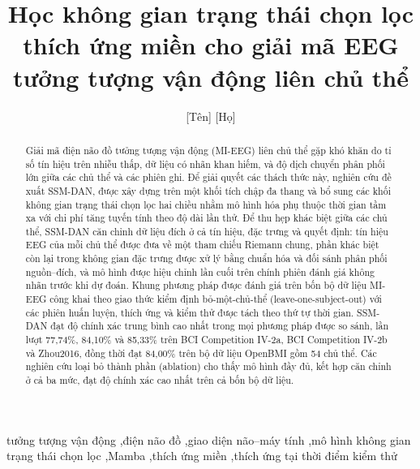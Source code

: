\documentclass[preprint,12pt]{elsarticle}
\begin{document}
\begin{frontmatter}

\title{Học không gian trạng thái chọn lọc thích ứng miền cho giải mã EEG tưởng tượng vận động liên chủ thể}

\author[aff1]{[Tên] [Họ]}


\begin{abstract}
Giải mã điện não đồ tưởng tượng vận động (MI-EEG) liên chủ thể gặp khó khăn do tỉ số tín hiệu trên nhiễu thấp, dữ liệu có nhãn khan hiếm, và độ dịch chuyển phân phối lớn giữa các chủ thể và các phiên ghi. Để giải quyết các thách thức này, nghiên cứu đề xuất SSM-DAN, được xây dựng trên một khối tích chập đa thang và bổ sung các khối không gian trạng thái chọn lọc hai chiều nhằm mô hình hóa phụ thuộc thời gian tầm xa với chi phí tăng tuyến tính theo độ dài lần thử. Để thu hẹp khác biệt giữa các chủ thể, SSM-DAN căn chỉnh dữ liệu đích ở cả tín hiệu, đặc trưng và quyết định: tín hiệu EEG của mỗi chủ thể được đưa về một tham chiếu Riemann chung, phần khác biệt còn lại trong không gian đặc trưng được xử lý bằng chuẩn hóa và đối sánh phân phối nguồn--đích, và mô hình được hiệu chỉnh lần cuối trên chính phiên đánh giá không nhãn trước khi dự đoán. Khung phương pháp được đánh giá trên bốn bộ dữ liệu MI-EEG công khai theo giao thức kiểm định bỏ-một-chủ-thể (leave-one-subject-out) với các phiên huấn luyện, thích ứng và kiểm thử được tách theo thứ tự thời gian. SSM-DAN đạt độ chính xác trung bình cao nhất trong mọi phương pháp được so sánh, lần lượt 77,74\%, 84,10\% và 85,33\% trên BCI Competition IV-2a, BCI Competition IV-2b và Zhou2016, đồng thời đạt 84,00\% trên bộ dữ liệu OpenBMI gồm 54 chủ thể. Các nghiên cứu loại bỏ thành phần (ablation) cho thấy mô hình đầy đủ, kết hợp căn chỉnh ở cả ba mức, đạt độ chính xác cao nhất trên cả bốn bộ dữ liệu.
\end{abstract}

\begin{keyword}
tưởng tượng vận động \sep điện não đồ \sep giao diện não--máy tính \sep mô hình không gian trạng thái chọn lọc \sep Mamba \sep thích ứng miền \sep thích ứng tại thời điểm kiểm thử
\end{keyword}

\end{frontmatter}
\end{document}
